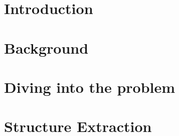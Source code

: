 \documentclass{report}
\begin{document}
\chapter{Introduction}


\chapter{Background}


\chapter{Diving into the problem}


\chapter{Structure Extraction}

\end{document}
